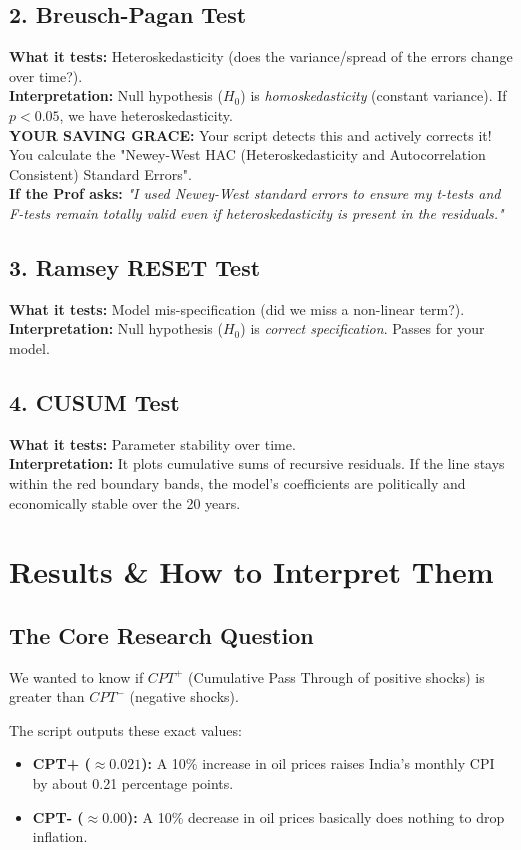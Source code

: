 \documentclass[12pt,a4paper]{report}
\begin{document}
\section{2. Breusch-Pagan Test}
\textbf{What it tests:} Heteroskedasticity (does the variance/spread of the errors change over time?).\\
\textbf{Interpretation:} Null hypothesis ($H_0$) is \textit{homoskedasticity} (constant variance). If $p < 0.05$, we have heteroskedasticity. \\
\textbf{YOUR SAVING GRACE:} Your script detects this and actively corrects it! You calculate the "Newey-West HAC (Heteroskedasticity and Autocorrelation Consistent) Standard Errors". \\
\textbf{If the Prof asks:} \textit{"I used Newey-West standard errors to ensure my t-tests and F-tests remain totally valid even if heteroskedasticity is present in the residuals."}

\section{3. Ramsey RESET Test}
\textbf{What it tests:} Model mis-specification (did we miss a non-linear term?).\\
\textbf{Interpretation:} Null hypothesis ($H_0$) is \textit{correct specification}. Passes for your model.

\section{4. CUSUM Test}
\textbf{What it tests:} Parameter stability over time.\\
\textbf{Interpretation:} It plots cumulative sums of recursive residuals. If the line stays within the red boundary bands, the model's coefficients are politically and economically stable over the 20 years.

\newpage
\chapter{Results \& How to Interpret Them}

\section{The Core Research Question}
We wanted to know if $CPT^+$ (Cumulative Pass Through of positive shocks) is greater than $CPT^-$ (negative shocks).

The script outputs these exact values:
\begin{itemize}
    \item \textbf{CPT+ ($\approx 0.021$):} A 10\% increase in oil prices raises India's monthly CPI by about 0.21 percentage points.
    \item \textbf{CPT- ($\approx 0.00$):} A 10\% decrease in oil prices basically does nothing to drop inflation.
\end{itemize}
\end{document}

